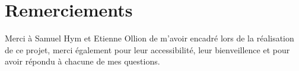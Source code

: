 \section*{Remerciements}

Merci à Samuel Hym et Etienne Ollion de m'avoir encadré lors de la réalisation de ce projet, merci également pour leur accessibilité, leur bienveillence et pour avoir répondu à chacune de mes questions.
